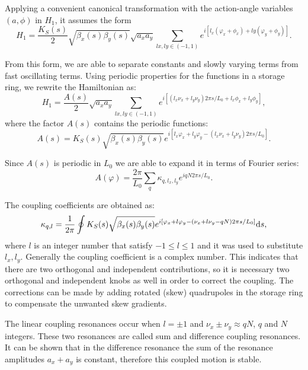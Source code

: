 Applying a convenient canonical transformation with the action-angle variables $(a, \phi)$ in $H_1$, it assumes the form
\begin{equation*}
    H_1 = \dfrac{K_S(s)}{2}\sqrt{\beta_x(s)\beta_y(s)} \sqrt{a_x a_y} \sum_{lx, ly \in (-1, 1)} e^{i\left[l_x(\varphi_x + \phi_x) + ly(\varphi_y + \phi_y)\right]}.
\end{equation*}

From this form, we are able to separate constants and slowly varying terms from fast oscillating terms. Using periodic properties for the functions in a storage ring, we rewrite the Hamiltonian as:
\begin{equation*}
    H_1 = \dfrac{A(s)}{2} \sqrt{a_x a_y} \sum_{lx, ly \in (-1, 1)} e^{i\left[\left(l_x\nu_x + l_y\nu_y\right)2\pi s/L_0 + l_x\phi_x + l_y\phi_y\right]},
\end{equation*}
where the factor $A(s)$ contains the periodic functions:
\begin{equation*}
    A(s) = K_S(s) \sqrt{\beta_x(s) \beta_y(s)} e^{i\left[l_x\varphi_x + l_y\varphi_y - \left(l_x\nu_x + l_y\nu_y\right)2\pi s/L_0\right]}.
\end{equation*}

Since $A(s)$ is periodic in $L_0$ we are able to expand it in terms of Fourier series:
\begin{equation*}
    A(\varphi) = \dfrac{2\pi}{L_0} \sum_{q} \kappa_{q, l_x, l_y}e^{i q N 2 \pi s/L_0}.
\end{equation*}

The coupling coefficients are obtained as:
\begin{equation}
    \kappa_{q, l} = \dfrac{1}{2\pi} \oint K_S(s) \sqrt{\beta_x(s) \beta_y(s)} e^{i\left[\varphi_x + l\varphi_y - \left(\nu_x + l\nu_y - qN\right)2\pi s/L_0\right]}\mathrm{d} s,
\end{equation}
where $l$ is an integer number that satisfy $-1 \leq l \leq 1$ and it was used to substitute $l_x, l_y$. Generally the coupling coefficient is a complex number. This indicates that there are two orthogonal and independent contributions, so it is necessary two orthogonal and independent knobs as well in order to correct the coupling. The corrections can be made by adding rotated (skew) quadrupoles in the storage ring to compensate the unwanted skew gradients.

The linear coupling resonances occur when $l = \pm 1$ and $\nu_x \pm \nu_y \approx qN$, $q$ and $N$ integers. These two resonances are called sum and difference coupling resonances. It can be shown that in the difference resonance the sum of the resonance amplitudes $a_x + a_y$ is constant, therefore this coupled motion is stable.

